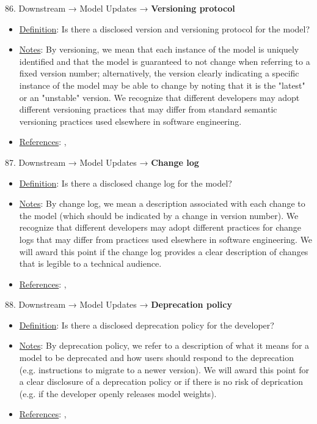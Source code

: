 86. Downstream → Model Updates → \textbf{Versioning protocol}
\vspace{-\parskip}
\begin{itemize}
	\item
	\underline{Definition}: Is there a disclosed version and versioning protocol for the model?
	\item
	\underline{Notes}: By versioning, we mean that each instance of the model is uniquely identified and that the model is guaranteed to not change when referring to a fixed version number; alternatively, the version clearly indicating a specific instance of the model may be able to change by noting that it is the "latest" or an "unstable" version. We recognize that different developers may adopt different versioning practices that may differ from standard semantic versioning practices used elsewhere in software engineering.
	\item
	\underline{References}: \citet{chen2023chatgpts}, \citet{Lam2020}
\end{itemize}


87. Downstream → Model Updates → \textbf{Change log}
\vspace{-\parskip}
\begin{itemize}
	\item
	\underline{Definition}: Is there a disclosed change log for the model?
	\item
	\underline{Notes}: By change log, we mean a description associated with each change to the model (which should be indicated by a change in version number). We recognize that different developers may adopt different practices for change logs that may differ from practices used elsewhere in software engineering. We will award this point if the change log provides a clear description of changes that is legible to a technical audience.
	\item
	\underline{References}: \citet{chen2023chatgpts}, \citet{li2016watch}
\end{itemize}


88. Downstream → Model Updates → \textbf{Deprecation policy}
\vspace{-\parskip}
\begin{itemize}
	\item
	\underline{Definition}: Is there a disclosed deprecation policy for the developer?
	\item
	\underline{Notes}: By deprecation policy, we refer to a description of what it means for a model to be deprecated and how users should respond to the deprecation (e.g. instructions to migrate to a newer version). We will award this point for a clear disclosure of a deprecation policy or if there is no risk of deprication (e.g. if the developer openly releases model weights).
	\item
	\underline{References}: \citet{chen2023chatgpts}, \citet{haryono2020automatic}
\end{itemize}


